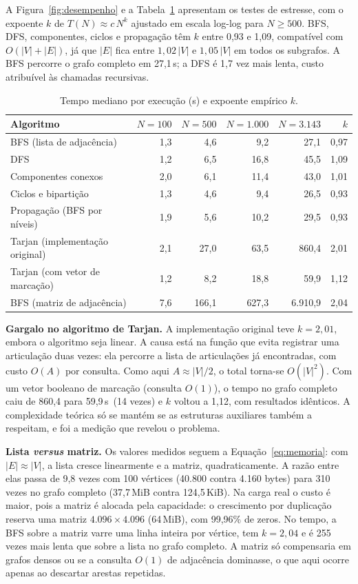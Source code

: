 \documentclass[12pt,a4paper]{article}
\newcommand{\us}{\,\textmu s}
\begin{document}
A Figura~\ref{fig:desempenho} e a Tabela~\ref{tab:tempos} apresentam os testes de estresse, com o expoente $k$ de $T(N) \approx c\,N^k$ ajustado em escala log-log para $N \ge 500$. BFS, DFS, componentes, ciclos e propagação têm $k$ entre 0,93 e 1,09, compatível com $O(|V|+|E|)$, já que $|E|$ fica entre $1{,}02\,|V|$ e $1{,}05\,|V|$ em todos os subgrafos. A BFS percorre o grafo completo em 27,1\us; a DFS é 1,7 vez mais lenta, custo atribuível às chamadas recursivas.


\begin{table}[!htb]
\caption{Tempo mediano por execução (\textmu s) e expoente empírico $k$.}
\label{tab:tempos}
\centering\small
\begin{tabular}{@{}lrrrrr@{}}
\toprule
\textbf{Algoritmo} & $N=100$ & $N=500$ & $N=1.000$ & $N=3.143$ & $k$\\
\midrule
BFS (lista de adjacência)  & 1,3 & 4,6 & 9,2 & 27,1 & 0,97\\
DFS                        & 1,2 & 6,5 & 16,8 & 45,5 & 1,09\\
Componentes conexos        & 2,0 & 6,1 & 11,4 & 43,0 & 1,01\\
Ciclos e bipartição        & 1,3 & 4,6 & 9,4 & 26,5 & 0,93\\
Propagação (BFS por níveis)& 1,9 & 5,6 & 10,2 & 29,5 & 0,93\\
Tarjan (implementação original) & 2,1 & 27,0 & 63,5 & 860,4 & 2,01\\
Tarjan (com vetor de marcação)  & 1,2 & 8,2 & 18,8 & 59,9 & 1,12\\
BFS (matriz de adjacência) & 7,6 & 166,1 & 627,3 & 6.910,9 & 2,04\\
\bottomrule
\end{tabular}
\end{table}

\textbf{Gargalo no algoritmo de Tarjan.} A implementação original teve $k = 2{,}01$, embora o algoritmo seja linear. A causa está na função que evita registrar uma articulação duas vezes: ela percorre a lista de articulações já encontradas, com custo $O(A)$ por consulta. Como aqui $A \approx |V|/2$, o total torna-se $O(|V|^2)$. Com um vetor booleano de marcação (consulta $O(1)$), o tempo no grafo completo caiu de 860,4 para 59,9\us\ (14 vezes) e $k$ voltou a 1,12, com resultados idênticos. A complexidade teórica só se mantém se as estruturas auxiliares também a respeitam, e foi a medição que revelou o problema.

\textbf{Lista \emph{versus} matriz.} Os valores medidos seguem a Equação~\ref{eq:memoria}: com $|E| \approx |V|$, a lista cresce linearmente e a matriz, quadraticamente. A razão entre elas passa de 9,8 vezes com 100 vértices (40.800 contra 4.160 bytes) para 310 vezes no grafo completo (37,7\,MiB contra 124,5\,KiB). Na carga real o custo é maior, pois a matriz é alocada pela capacidade: o crescimento por duplicação reserva uma matriz $4.096 \times 4.096$ (64\,MiB), com 99,96\% de zeros. No tempo, a BFS sobre a matriz varre uma linha inteira por vértice, tem $k = 2{,}04$ e é 255 vezes mais lenta que sobre a lista no grafo completo. A matriz só compensaria em grafos densos ou se a consulta $O(1)$ de adjacência dominasse, o que aqui ocorre apenas ao descartar arestas repetidas.
\end{document}
